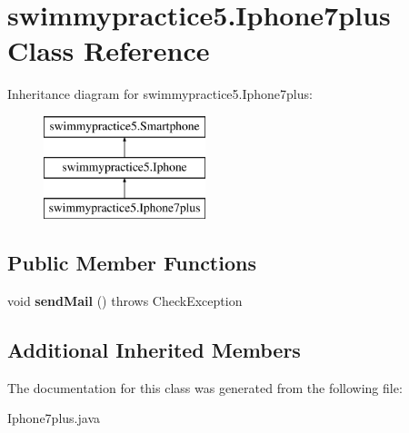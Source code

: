 \hypertarget{classswimmypractice5_1_1_iphone7plus}{}\section{swimmypractice5.\+Iphone7plus Class Reference}
\label{classswimmypractice5_1_1_iphone7plus}
Inheritance diagram for swimmypractice5.\+Iphone7plus\+:\begin{figure}[H]
\begin{center}
\leavevmode
\includegraphics[height=3.000000cm]{classswimmypractice5_1_1_iphone7plus}
\end{center}
\end{figure}
\subsection*{Public Member Functions}
\begin{DoxyCompactItemize}
\item 
\mbox{\label{classswimmypractice5_1_1_iphone7plus_a1c5399c99a122551b7f8fee9bc4b56c1}} 
void {\bfseries send\+Mail} ()  throws Check\+Exception
\end{DoxyCompactItemize}
\subsection*{Additional Inherited Members}


The documentation for this class was generated from the following file\+:\begin{DoxyCompactItemize}
\item 
Iphone7plus.\+java\end{DoxyCompactItemize}
